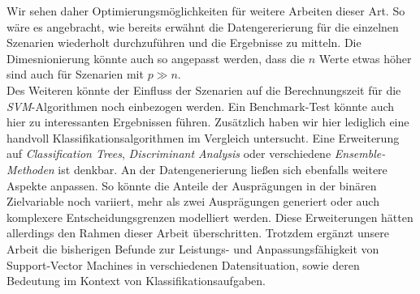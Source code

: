 \documentclass[
]{article}
\begin{document}
Wir sehen daher Optimierungsmöglichkeiten für weitere Arbeiten dieser
Art. So wäre es angebracht, wie bereits erwähnt die Datengererierung für
die einzelnen Szenarien wiederholt durchzuführen und die Ergebnisse zu
mitteln. Die Dimesnionierung könnte auch so angepasst werden, dass die
\(n\) Werte etwas höher sind auch für Szenarien mit \(p \gg n\).\\
Des Weiteren könnte der Einfluss der Szenarien auf die Berechnungszeit
für die \textit{SVM}-Algorithmen noch einbezogen werden. Ein
Benchmark-Test könnte auch hier zu interessanten Ergebnissen führen.
Zusätzlich haben wir hier lediglich eine handvoll
Klassifikationsalgorithmen im Vergleich untersucht. Eine Erweiterung auf
\textit{Classification Trees}, \textit{Discriminant Analysis} oder
verschiedene \textit{Ensemble-Methoden} ist denkbar. An der
Datengenerierung ließen sich ebenfalls weitere Aspekte anpassen. So
könnte die Anteile der Ausprägungen in der binären Zielvariable noch
variiert, mehr als zwei Ausprägungen generiert oder auch komplexere
Entscheidungsgrenzen modelliert werden. Diese Erweiterungen hätten
allerdings den Rahmen dieser Arbeit überschritten. Trotzdem ergänzt
unsere Arbeit die bisherigen Befunde zur Leistungs- und
Anpassungsfähigkeit von Support-Vector Machines in verschiedenen
Datensituation, sowie deren Bedeutung im Kontext von
Klassifikationsaufgaben. \newpage


\printbibliography
\end{document}
